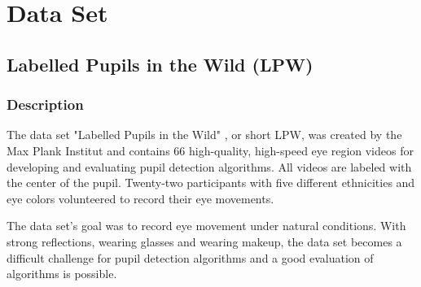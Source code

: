 

\chapter{Data Set}
\section{Labelled Pupils in the Wild (LPW)}
\subsection{Description}

The data set "Labelled Pupils in the Wild" \cite{zhang_max-planck-institut_nodate}, or short LPW, was created by the Max Plank Institut and contains 66 high-quality, high-speed eye region videos for developing and evaluating pupil detection algorithms. All videos are labeled with the center of the pupil. Twenty-two participants with five different ethnicities and eye colors volunteered to record their eye movements.  

The data set's goal was to record eye movement under natural conditions. With strong reflections, wearing glasses and wearing makeup, the data set becomes a difficult challenge for pupil detection algorithms and a good evaluation of algorithms is possible.


